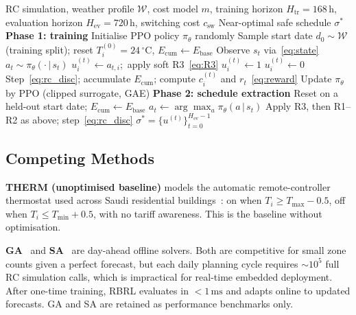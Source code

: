 \documentclass[3p,number]{elsarticle}
\let\oldsubsection\subsection
\renewcommand{\subsection}{\FloatBarrier\oldsubsection}
\newcommand{\sched}{\sigma}
\newcommand{\Tmin}{T_{\min}}
\newcommand{\Tmax}{T_{\max}}
\newcommand{\csw}{c_{\mathrm{sw}}}
\begin{document}
\begin{algorithm}[H]
\caption{RBRL: Training and Schedule Extraction}
\label{alg:rbrl}
\begin{algorithmic}[1]
\Require RC simulation, weather profile $\mathcal{W}$, cost model $m$,
  training horizon $H_{\mathrm{tr}}=168$\,h, evaluation horizon
  $H_{\mathrm{ev}}=720$\,h, switching cost $\csw$
\Ensure Near-optimal safe schedule $\sched^*$
\Statex \textbf{Phase 1: training}
\State Initialise PPO policy $\pi_\theta$ randomly
  \State Sample start date $d_0\sim\mathcal{W}$ (training split);
         reset $T_i^{(0)}\!=\!24\,^\circ$C, $E_{\mathrm{cum}}\!\leftarrow\!E_{\mathrm{base}}$
    \State Observe $s_t$ via~\eqref{eq:state}
    \State $a_t\sim\pi_\theta(\cdot\,|\,s_t)$ 
      \State $u_i^{(t)}\leftarrow a_{t,i}$;\, apply soft R3~\eqref{eq:R3}
      \If{$T_i^{(t)}\ge\Tmax-\epsilon_{\mathrm{g}}$}
        $u_i^{(t)}\leftarrow1$ 
      \ElsIf{$T_i^{(t)}\le\Tmin+\epsilon_{\mathrm{g}}$}
        $u_i^{(t)}\leftarrow0$ 
      \EndIf
    \EndFor
    \State Step~\eqref{eq:rc_disc}; accumulate $E_{\mathrm{cum}}$;
           compute $c_i^{(t)}$ and $r_t$~\eqref{eq:reward}
  \EndFor
  \State Update $\pi_\theta$ by PPO (clipped surrogate, GAE)
\EndFor
\Statex \textbf{Phase 2: schedule extraction}
\State Reset on a held-out start date; $E_{\mathrm{cum}}\leftarrow E_{\mathrm{base}}$
  \State $a_t\leftarrow\arg\max_a\pi_\theta(a\,|\,s_t)$ 
  \State Apply R3, then R1--R2 as above; step~\eqref{eq:rc_disc}
\EndFor
\State\Return $\sched^*=\{u^{(t)}\}_{t=0}^{H_{\mathrm{ev}}-1}$
\end{algorithmic}
\end{algorithm}
 
\subsection{Competing Methods}
\label{subsec:compete}
 
\textbf{THERM (unoptimised baseline)} models the automatic remote-controller thermostat used across Saudi residential buildings~\cite{Alotaibi2024}: on when $T_i\ge\Tmax-0.5$, off when $T_i\le\Tmin+0.5$, with no tariff awareness.
This is the baseline without optimisation.
 
\textbf{GA}~\cite{ElMakroum2023} and \textbf{SA}~\cite{Bandarra2025} are day-ahead offline solvers.
Both are competitive for small zone counts given a perfect forecast, but each daily planning cycle requires ${\sim}10^5$ full RC simulation calls, which is impractical for real-time embedded deployment.
After one-time training, RBRL evaluates in ${<}1\,\text{ms}$ and adapts online to updated forecasts.
GA and SA are retained as performance benchmarks only.
 
\end{document}
